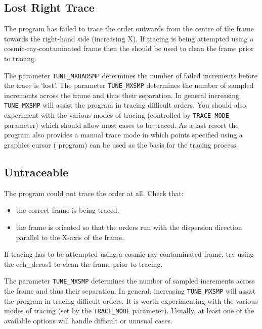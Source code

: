 \documentclass[twoside,11pt,nolof]{starlink}
\newcommand{\mlabel}[1]{\xlabel{#1}\label{#1}}
\begin{document}
\subsection{\mlabel{lost_right_trace} Lost Right Trace}

The program has failed to trace the order outwards from the centre of
the frame towards the right-hand side (increasing X). If tracing is
being attempted using a cosmic-ray-contaminated frame then the
should be used to clean the frame prior to tracing.

The parameter \texttt{TUNE\_MXBADSMP} determines the number of failed
increments before the trace is `lost'. The parameter \texttt{TUNE\_MXSMP}
determines the number of sampled increments across the frame and thus
their separation. In general increasing \texttt{TUNE\_MXSMP} will assist the
program in tracing difficult orders.  You should also experiment
with the various modes of tracing (controlled by \texttt{TRACE\_MODE} parameter)
which should allow most cases to be traced. As a last resort the program
also provides a manual trace mode in which points specified using a
graphics cursor ( program) can be used as the basis
for the tracing process.


\subsection{\mlabel{untraceable} Untraceable}

 The program could not trace the order at all.  Check that:

\begin{itemize}

\item the correct frame is being traced.

\item the frame is oriented so that the orders run with the dispersion
      direction parallel to the X-axis of the frame.

\end{itemize}

 If tracing has to be attempted using a cosmic-ray-con\-tami\-nated
 frame, try using the 
 {ech_decos1} to clean the frame prior to tracing.

 The parameter \texttt{TUNE\_MXSMP} determines the number of sampled increments
 across the frame and thus their separation.  In general, increasing
 \texttt{TUNE\_MXSMP} will assist the program in tracing difficult orders.
 It is worth experimenting with the various modes of tracing (set by
 the \texttt{TRACE\_MODE} parameter).  Usually, at least one of the available
 options will handle difficult or unusual cases.
\end{document}

